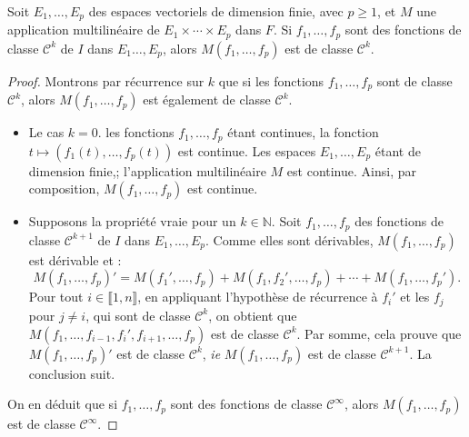 \documentclass[french]{article}
\newcommand{\N}{\mathbb{N}}
\theoremstyle{plain}
\theoremstyle{definition}
\theoremstyle{remark}
\begin{document}
\begin{prop}%
	Soit $E_1,\ldots,E_p$ des espaces vectoriels de dimension finie, avec $p\geqslant 1$, et $M$ une application multilinéaire de $E_1\times\cdots\times E_p$ dans $F$. Si $f_1,\ldots,f_p$ sont des fonctions de classe $\mathcal{C}^k$ de $I$ dans $E_1\ldots,E_p$, alors $M(f_1,\ldots,f_p)$ est de classe $\mathcal{C}^k$.
\end{prop}
\begin{proof}
	Montrons par récurrence sur $k$ que si les fonctions $f_1,\ldots,f_p$ sont de classe $\mathcal{C}^k$, alors $M(f_1,\ldots,f_p)$ est également de classe $\mathcal{C}^k$.
	\begin{itemize}
		\item Le cas $k=0$. les fonctions $f_1,\ldots,f_p$ étant continues, la fonction $t\mapsto(f_1(t),\ldots,f_p(t))$ est continue. Les espaces $E_1,\ldots,E_p$ étant de dimension finie,; l'application multilinéaire $M$ est continue. Ainsi, par composition, $M(f_1,\ldots,f_p)$ est continue.
		\item Supposons la propriété vraie pour un $k\in\N$. Soit $f_1,\ldots,f_p$ des fonctions de classe $\mathcal{C}^{k+1}$ de $I$ dans $E_1,\ldots,E_p$. Comme elles sont dérivables, $M(f_1,\ldots,f_p)$ est dérivable et :
		$$M(f_1,\ldots,f_p)'=M(f_1',\ldots,f_p)+M(f_1,f_2',\ldots,f_p)+\cdots+M(f_1,\ldots,f_p').$$
		Pour tout $i\in\llbracket1,n\rrbracket$, en appliquant l'hypothèse de récurrence à $f_i'$ et les $f_j$ pour $j\ne i$, qui sont de classe $\mathcal{C}^k$, on obtient que $M(f_1,\ldots,f_{i-1},f_i',f_{i+1},\ldots,f_p)$ est de classe $\mathcal{C}^k$. Par somme, cela prouve que $M(f_1,\ldots,f_p)'$ est de classe $\mathcal{C}^k$, \textit{ie} $M(f_1,\ldots,f_p)$ est de classe $\mathcal{C}^{k+1}$. La conclusion suit.
	\end{itemize}
	On en déduit que si $f_1,\ldots,f_p$ sont des fonctions de classe $\mathcal{C}^\infty$, alors $M(f_1,\ldots,f_p)$ est de classe $\mathcal{C}^\infty$.
\end{proof}
\end{document}
